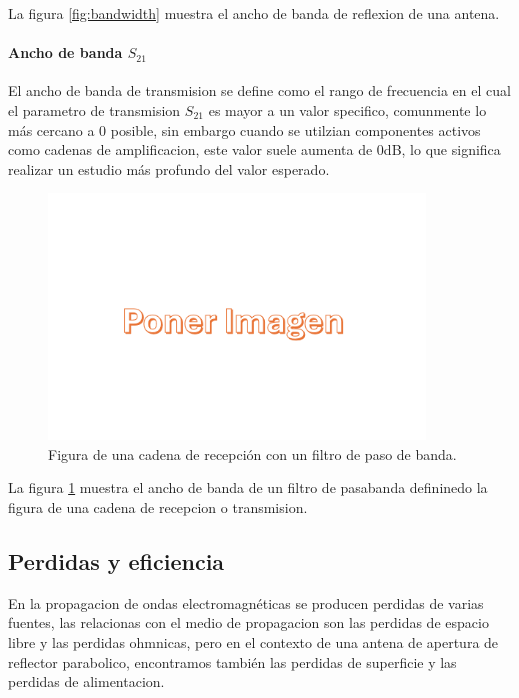 La figura \ref{fig:bandwidth} muestra el ancho de banda de reflexion de una antena.\\

\paragraph{Ancho de banda $S_{21}$} El ancho de banda de transmision se define como el rango de frecuencia en el cual el parametro de transmision $S_{21}$ es mayor a un valor specifico, comunmente lo más cercano a 0 posible, sin embargo cuando se utilzian componentes activos como cadenas de amplificacion, este valor suele aumenta de 0dB, lo que significa realizar un estudio más profundo del valor esperado.\\

\begin{figure}
    \centering
    \includegraphics[width = 10cm]{img/imagen.png}
    \caption{Figura de una cadena de recepción con un filtro de paso de banda.}
    \label{fig:bandwidth2}
\end{figure}

La figura \ref{fig:bandwidth2} muestra el ancho de banda de un filtro de pasabanda defininedo la figura de una cadena de recepcion o transmision.\\


\subsection{Perdidas y eficiencia}

En la propagacion de ondas electromagnéticas se producen perdidas de varias fuentes, las relacionas con el medio de propagacion son las perdidas de espacio libre y las perdidas ohmnicas, pero en el contexto de una antena de apertura de reflector parabolico, encontramos también las perdidas de superficie y las perdidas de alimentacion.\\

